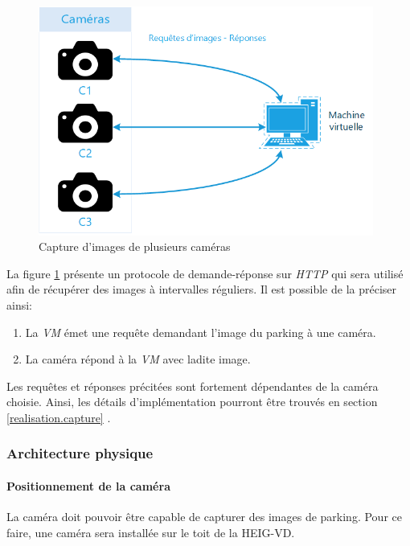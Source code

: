 \begin{figure}[!ht]
    \includegraphics[width=110mm]{img/conception/logic_arch.png}
    \centering
    \caption{Capture d'images de plusieurs caméras}
    \label{fig:capture_cameras}
\end{figure}

La figure \ref{fig:capture_cameras} présente un protocole de demande-réponse sur \textit{HTTP} qui sera utilisé afin de récupérer des images à intervalles réguliers. Il est possible de la préciser ainsi:

\begin{enumerate}
    \item La \textit{VM} émet une requête demandant l'image du parking à une caméra. 
    \item La caméra répond à la \textit{VM} avec ladite image.
\end{enumerate}

Les requêtes et réponses précitées sont fortement dépendantes de la caméra choisie. Ainsi, les détails d'implémentation pourront être trouvés en section \ref{realisation.capture} .


\subsubsection{Architecture physique}\label{conception.architecture.camera.physique}
\paragraph{Positionnement de la caméra}\label{conception.architecture.camera.physique.position}
La caméra doit pouvoir être capable de capturer des images de parking. Pour ce faire, une caméra sera installée sur le toit de la HEIG-VD. 

